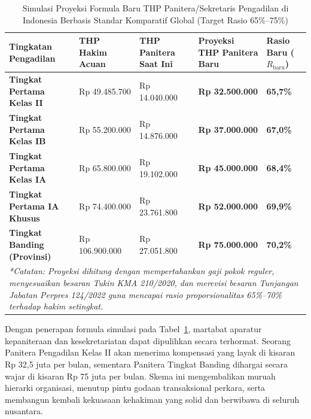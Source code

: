 \documentclass[12pt, a4paper]{article}
\begin{document}
\begin{table}[H]
\centering
\fontsize{9}{11}\selectfont
\caption{Simulasi Proyeksi Formula Baru THP Panitera/Sekretaris Pengadilan di Indonesia Berbasis Standar Komparatif Global (Target Rasio 65\%--75\%)}
\label{tab:simulasi-rekomendasi-thp}
\renewcommand{\arraystretch}{1.35}
\begin{tabular}{p{4.1cm} p{2.5cm} p{2.5cm} p{2.5cm} p{2.1cm}}
\hline
\textbf{Tingkatan Pengadilan} & \textbf{THP Hakim Acuan} & \textbf{THP Panitera Saat Ini} & \textbf{Proyeksi THP Panitera Baru} & \textbf{Rasio Baru ($R_{\text{baru}}$)} \tabularnewline
\hline
\raggedright\textbf{Tingkat Pertama Kelas II} & Rp 49.485.700 & Rp 14.040.000 & \textbf{Rp 32.500.000} & \textbf{65,7\%} \tabularnewline
\raggedright\textbf{Tingkat Pertama Kelas IB} & Rp 55.200.000 & Rp 14.876.000 & \textbf{Rp 37.000.000} & \textbf{67,0\%} \tabularnewline
\raggedright\textbf{Tingkat Pertama Kelas IA} & Rp 65.800.000 & Rp 19.102.000 & \textbf{Rp 45.000.000} & \textbf{68,4\%} \tabularnewline
\raggedright\textbf{Tingkat Pertama IA Khusus} & Rp 74.400.000 & Rp 23.761.800 & \textbf{Rp 52.000.000} & \textbf{69,9\%} \tabularnewline
\raggedright\textbf{Tingkat Banding (Provinsi)} & Rp 106.900.000 & Rp 27.051.800 & \textbf{Rp 75.000.000} & \textbf{70,2\%} \tabularnewline
\hline
\multicolumn{5}{p{13.7cm}}{\textit{*Catatan: Proyeksi dihitung dengan mempertahankan gaji pokok reguler, menyesuaikan besaran Tukin KMA 210/2020, dan merevisi besaran Tunjangan Jabatan Perpres 124/2022 guna mencapai rasio proporsionalitas 65\%--70\% terhadap hakim setingkat.}} \tabularnewline
\hline
\end{tabular}
\end{table}

Dengan penerapan formula simulasi pada Tabel~\ref{tab:simulasi-rekomendasi-thp}, martabat aparatur kepaniteraan dan kesekretariatan dapat dipulihkan secara terhormat. Seorang Panitera Pengadilan Kelas II akan menerima kompensasi yang layak di kisaran Rp 32,5 juta per bulan, sementara Panitera Tingkat Banding dihargai secara wajar di kisaran Rp 75 juta per bulan. Skema ini mengembalikan muruah hierarki organisasi, menutup pintu godaan transaksional perkara, serta membangun kembali kekuasaan kehakiman yang solid dan berwibawa di seluruh nusantara.
\end{document}
